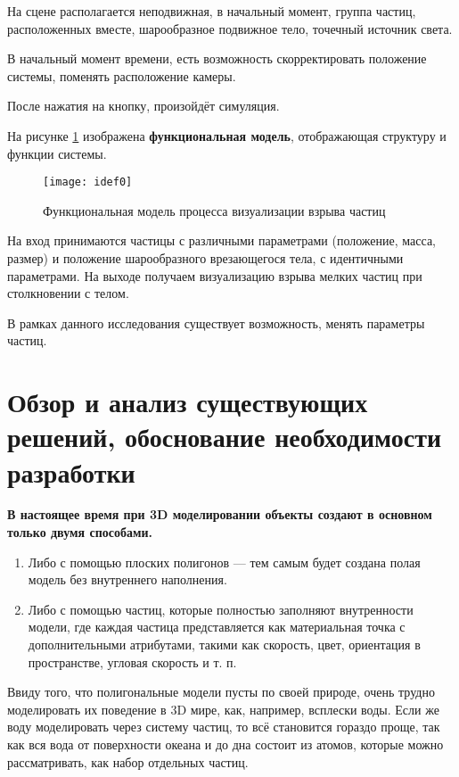 На сцене располагается неподвижная, в начальный момент, группа частиц, расположенных вместе, шарообразное подвижное тело, точечный источник света.
	
В начальный момент времени, есть возможность скорректировать положение системы, поменять расположение камеры.
	
После нажатия на кнопку, произойдёт симуляция.

На рисунке \ref{img:idef0} изображена \textbf{функциональная модель}, отображающая структуру и функции системы. 

\begin{figure}[H]
	\centering
	\texttt{[image: idef0]}
	\caption{Функциональная модель процесса визуализации взрыва частиц}
	\label{img:idef0}
\end{figure}

На вход принимаются частицы с различными параметрами (положение, масса, размер) и положение шарообразного врезающегося тела, с идентичными параметрами. На выходе получаем визуализацию взрыва мелких частиц при столкновении с телом. 

В рамках данного исследования существует возможность, менять параметры частиц. 

\section{\textbf{Обзор и анализ существующих решений, обоснование необходимости разработки}}

\textbf{В настоящее время при 3D моделировании объекты создают в основном только двумя способами.} \cite{3dgraphic}
\begin{enumerate}
	\item[1. ] Либо с помощью плоских полигонов — тем самым будет создана полая модель без внутреннего наполнения. 
	\item[2. ] Либо с помощью частиц, которые полностью заполняют внутренности модели, где каждая частица представляется как материальная точка с дополнительными атрибутами, такими как скорость, цвет, ориентация в пространстве, угловая скорость и т. п.
\end{enumerate}

Ввиду того, что полигональные модели пусты по своей природе, очень трудно моделировать их поведение в 3D мире, как, например, всплески воды. Если же воду моделировать через систему частиц, то всё становится гораздо проще, так как вся вода от поверхности океана и до дна состоит из атомов, которые можно рассматривать, как набор отдельных частиц.

